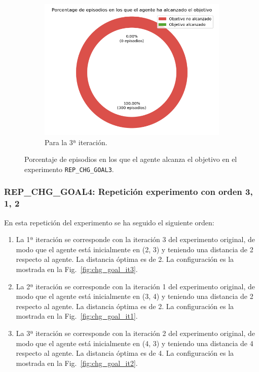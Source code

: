 \begin{figure}
\begin{subfigure}{.5\textwidth}
    \end{subfigure}
    \begin{subfigure}{.5\textwidth}
        \centering
        \includegraphics[scale=0.3]{cap5_experimentacion/images/CHANGE_GOAL-20_09-21_47-1, 2, 0_it3_porcentajeResuelto.png}
        \caption{Para la 3ª iteración.}
        \label{fig:HANGE_GOAL-20_09-21_47-1, 2, 0_it3_porcentajeRecompensa}
    \end{subfigure}%
    \caption{Porcentaje de episodios en los que el agente alcanza el objetivo en el experimento \texttt{REP\_CHG\_GOAL3}.}
    \label{fig:HANGE_GOAL-20_09-21_47-1, 2, 0_porcentajeRecompensa}
\end{figure}

\subsubsection{REP\_CHG\_GOAL4: Repetición experimento con orden 3, 1, 2} \label{REP_CHG_GOAL4}

En esta repetición del experimento se ha seguido el siguiente orden: 
\begin{enumerate}
    \item La 1ª iteración se corresponde con la iteración 3 del experimento original, de modo que el agente está inicialmente en (2, 3) y teniendo una distancia de 2 respecto al agente. La distancia óptima es de 2. La configuración es la mostrada en la Fig.~\ref{fig:chg_goal_it3}.
    \item La 2ª iteración se corresponde con la iteración 1 del experimento original, de modo que el agente está inicialmente en (3, 4) y teniendo una distancia de 2 respecto al agente. La distancia óptima es de 2. La configuración es la mostrada en la Fig.~\ref{fig:chg_goal_it1}.
    \item La 3ª iteración se corresponde con la iteración 2 del experimento original, de modo que el agente está inicialmente en (4, 3) y teniendo una distancia de 4 respecto al agente. La distancia óptima es de 4. La configuración es la mostrada en la Fig.~\ref{fig:chg_goal_it2}.
\end{enumerate}

